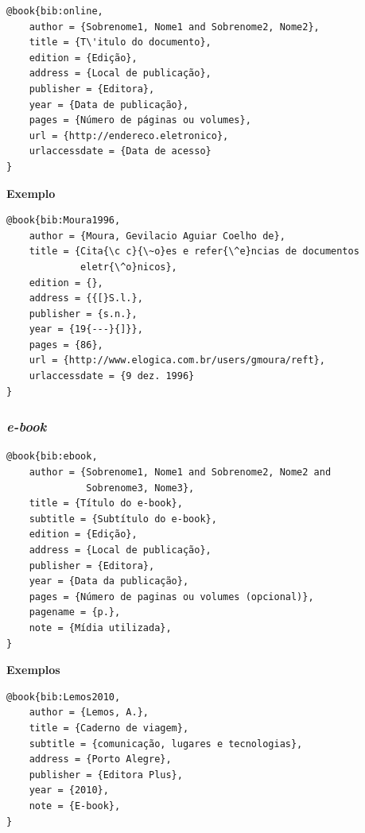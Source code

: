 \documentclass[a4paper,12pt,oneside,onecolumn,final,fleqn]{repUERJ}
\begin{document}
\begin{verbatim}
@book{bib:online,
    author = {Sobrenome1, Nome1 and Sobrenome2, Nome2},
    title = {T\'itulo do documento},
    edition = {Edição},
    address = {Local de publicação},
    publisher = {Editora},
    year = {Data de publicação},
    pages = {Número de páginas ou volumes},
    url = {http://endereco.eletronico},
    urlaccessdate = {Data de acesso}
}
\end{verbatim}

\noindent\textbf{Exemplo}\\

\noindent{}

\begin{verbatim}
@book{bib:Moura1996,
    author = {Moura, Gevilacio Aguiar Coelho de},
    title = {Cita{\c c}{\~o}es e refer{\^e}ncias de documentos
             eletr{\^o}nicos},
    edition = {},
    address = {{[}S.l.},
    publisher = {s.n.},
    year = {19{---}{]}},
    pages = {86},
    url = {http://www.elogica.com.br/users/gmoura/reft},
    urlaccessdate = {9 dez. 1996}
}
\end{verbatim}

\subsubsection{\textsl{e-book}}

\noindent{}

\begin{verbatim}
@book{bib:ebook,
    author = {Sobrenome1, Nome1 and Sobrenome2, Nome2 and
              Sobrenome3, Nome3},
    title = {Título do e-book},
    subtitle = {Subtítulo do e-book},
    edition = {Edição},
    address = {Local de publicação},
    publisher = {Editora},
    year = {Data da publicação},
    pages = {Número de paginas ou volumes (opcional)},
    pagename = {p.},
    note = {Mídia utilizada},
}
\end{verbatim}

\noindent\textbf{Exemplos}\\

\noindent{}

\begin{verbatim}
@book{bib:Lemos2010,
    author = {Lemos, A.},
    title = {Caderno de viagem},
    subtitle = {comunicação, lugares e tecnologias},
    address = {Porto Alegre},
    publisher = {Editora Plus},
    year = {2010},
    note = {E-book},
}
\end{verbatim}
\end{document}

